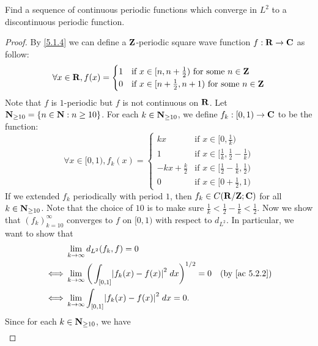 \begin{exercise}\label{ex 5.2.5}
  Find a sequence of continuous periodic functions which converge in \(L^2\) to a discontinuous periodic function.
\end{exercise}

\begin{proof}
  By \cref{5.1.4} we can define a \(\mathbf{Z}\)-periodic square wave function \(f : \mathbf{R} \to \mathbf{C}\) as follow:
  \[
    \forall x \in \mathbf{R}, f(x) = \begin{cases}
      1 & \text{if } x \in [n, n + \frac{1}{2}) \text{ for some } n \in \mathbf{Z}     \\
      0 & \text{if } x \in [n + \frac{1}{2}, n + 1) \text{ for some } n \in \mathbf{Z}
    \end{cases}
  \]
  Note that \(f\) is \(1\)-periodic but \(f\) is not continuous on \(\mathbf{R}\).
  Let \(\mathbf{N}_{\geq 10} = \{n \in \mathbf{N} : n \geq 10\}\).
  For each \(k \in \mathbf{N}_{\geq 10}\), we define \(f_k : [0, 1) \to \mathbf{C}\) to be the function:
  \[
    \forall x \in [0, 1), f_k(x) = \begin{cases}
      kx                & \text{if } x \in [0, \frac{1}{k})                         \\
      1                 & \text{if } x \in [\frac{1}{k}, \frac{1}{2} - \frac{1}{k}) \\
      -kx + \frac{k}{2} & \text{if } x \in [\frac{1}{2} - \frac{1}{k}, \frac{1}{2}) \\
      0                 & \text{if } x \in [0 + \frac{1}{2}, 1)
    \end{cases}
  \]
  If we extended \(f_k\) periodically with period \(1\), then \(f_k \in C(\mathbf{R} / \mathbf{Z} ; \mathbf{C})\) for all \(k \in \mathbf{N}_{\geq 10}\).
  Note that the choice of \(10\) is to make sure \(\frac{1}{k} < \frac{1}{2} - \frac{1}{k} < \frac{1}{2}\).
  Now we show that \((f_k)_{k = 10}^\infty\) converges to \(f\) on \([0, 1)\) with respect to \(d_{L^2}\).
  In particular, we want to show that
  \begin{align*}
         & \lim_{k \to \infty} d_{L^2}(f_k, f) = 0                                                                             \\
    \iff & \lim_{k \to \infty} \bigg(\int_{[0, 1]} \abs{f_k(x) - f(x)}^2 \; dx\bigg)^{1 / 2} = 0 & \text{(by \cref{ac 5.2.2})} \\
    \iff & \lim_{k \to \infty} \int_{[0, 1]} \abs{f_k(x) - f(x)}^2 \; dx = 0.
  \end{align*}
  Since for each \(k \in \mathbf{N}_{\geq 10}\), we have
  \begin{align*}

\end{align*}
\end{proof}
